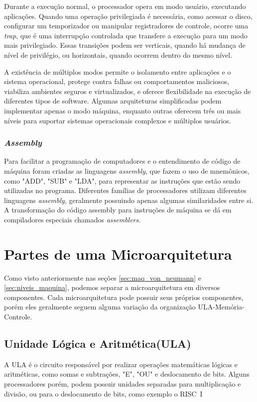 \documentclass[
	12pt,				%
	openright,			%
	oneside,			%
	a4paper,			%
	english,			%
	french,				%
	spanish,			%
	brazil,				%
	]{abntex2}
\begin{document}
Durante a execução normal, o processador opera em modo usuário, executando aplicações. Quando uma operação privilegiada é necessária, como acessar o disco, configurar um temporizador ou manipular registradores de controle, ocorre uma \textit{trap}, que é uma interrupção controlada que transfere a execução para um modo mais privilegiado. Essas transições podem ser verticais, quando há mudança de nível de privilégio, ou horizontais, quando ocorrem dentro do mesmo nível.\cite[p.10]{risc-v_risc-v_2024-1}

A existência de múltiplos modos permite o isolamento entre aplicações e o sistema operacional, protege contra falhas ou comportamentos maliciosos, viabiliza ambientes seguros e virtualizados, e oferece flexibilidade na execução de diferentes tipos de software. Algumas arquiteturas simplificadas podem implementar apenas o modo máquina, enquanto outras oferecem três ou mais níveis para suportar sistemas operacionais complexos e múltiplos usuários.\cite[p.10]{risc-v_risc-v_2024-1}

\subsubsection{\textit{Assembly}}
Para facilitar a programação de computadores e o entendimento de código de máquina foram criadas as linguagens \textit{assembly}, que fazem o uso de mnemônicos, como "ADD", "SUB" e "LDA", para representar as instruções que estão sendo utilizadas no programa. Diferentes famílias de processadores utilizam diferentes linguagens \textit{assembly}, geralmente possuindo apenas algumas similaridades entre si. A transformação do código assembly para instruções de máquina se dá em compiladores especiais chamados \textit{assemblers}.\cite[p.6-7]{catsoulis_designing_2002}

\section{Partes de uma Microarquitetura}
Como visto anteriormente nas seções \ref{sec:maq_von_neumann} e \ref{sec:niveis_maquina}, podemos separar a microarquitetura em diversos componentes. Cada microarquitetura pode possuir seus próprios componentes, porém eles geralmente seguem alguma variação da organização ULA-Memória-Controle.

\subsection{Unidade Lógica e Aritmética(ULA)}\label{sec:ULA}
A ULA é o circuito responsável por realizar operações matemáticas lógicas e aritméticas, como somas e subtrações, "E", "OU" e deslocamento de bits.\cite[p.60]{favero_organizacao_2011}
Alguns processadores porém, podem possuir unidades separadas para multiplicação e divisão, ou para o deslocamento de bits, como exemplo o RISC~I\cite[p.13]{catsoulis_designing_2002}
\end{document}
